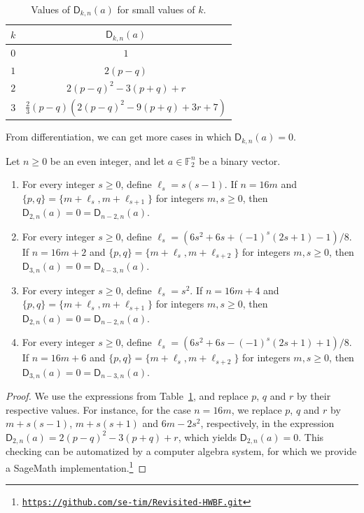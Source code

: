 \documentclass[runningheads,orivec]{llncs}
\newcommand{\Dkna}[3]{\mathsf{D}_{#2,#1}(a)}
\newcommand{\F}{\mathbb{F}}
\newcommand{\myurl}[1]{\footnote{\texttt{\url{#1}}}}
\let\geq=\geqslant
\begin{document}
    \begin{table}
    	\scriptsize
    	\centering
        \caption{Values of $\Dkna{n}{k}{a}$ for small values of $k$.}\label{tab:Dkna_small_k}
    	\begin{tabular}{|c|c|}
    		\hline
    		$k$ & $\Dkna nka$\\
    		\hline
    		$0$&$1$\\
    		$1$&$2(p-q)$\\ 
    		$2$&$2(p-q)^2-3(p+q)+r$\\
    		$3$&$\frac 23(p-q)\left(2(p-q)^2-9(p+q)+3r+7\right)$\\
    		\hline
    	\end{tabular}
    \end{table}
    
    From differentiation, we can get more cases in which $\Dkna nka=0$.
    
    \begin{proposition}
        Let $n\geq 0$ be an even integer, and let $a\in\F_2^n$ be a binary vector.
        \begin{enumerate}
            \item For every integer $s\geq0$, define $\ell_s=s(s-1)$. If $n=16m$ and $\{p,q\}=\{m+\ell_s,m+\ell_{s+1}\}$ for integers $m,s\geq 0$, then $\Dkna n2a=0=\Dkna n{n-2}a$.
            \item For every integer $s\geq 0$, define $\ell_s=\left(6s^2+6s+(-1)^s(2s+1)-1\right)/8$. If $n=16m+2$ and $\{p,q\}=\{m+\ell_s,m+\ell_{s+2}\}$ for integers $m,s\geq 0$, then $\Dkna n3a=0=\Dkna n{k-3}a$.
            \item For every integer $s\geq 0$, define $\ell_s=s^2$. If $n=16m+4$ and $\{p,q\}=\{m+\ell_s,m+\ell_{s+1}\}$ for integers $m,s\geq 0$, then $\Dkna n2a=0=\Dkna n{n-2}a$.
            \item For every integer $s\geq 0$, define $\ell_s=\left(6s^2+6s-(-1)^s(2s+1)+1\right)/8$. If $n=16m+6$ and $\{p,q\}=\{m+\ell_s,m+\ell_{s+2}\}$ for integers $m,s\geq 0$, then $\Dkna n3a=0=\Dkna n{n-3}a$.
        \end{enumerate}
    \end{proposition}
    
    \begin{proof}
    	We use the expressions from Table~\ref{tab:Dkna_small_k}, and replace $p$, $q$ and $r$ by their respective values. For instance, for the case $n=16m$, we replace $p$, $q$ and $r$ by $m+s(s-1)$, $m+s(s+1)$ and $6m-2s^2$, respectively, in the expression $\Dkna n2a=2(p-q)^2-3(p+q)+r$, which yields $\Dkna n2a=0$. This checking can be automatized by a computer algebra system, for which we provide a \textsf{SageMath} implementation.\myurl{https://github.com/se-tim/Revisited-HWBF.git}
    \end{proof}
    
\end{document}
